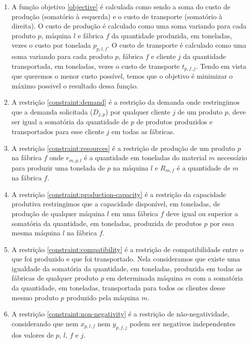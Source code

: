\documentclass{article}
\begin{document}
\begin{enumerate}
    \item A função objetivo \ref{objective} é calculada como sendo a soma do custo de produção (somatório à esquerda) e o custo de transporte (somatório à direita). O custo de produção é calculado como uma soma variando para cada produto $p$, máquina $l$ e fábrica $f$ da quantidade produzida, em toneladas, vezes o custo por tonelada $p_{p,l,f}$. O custo de transporte é calculado como uma soma variando para cada produto $p$, fábrica $f$ e cliente $j$ da quantidade transportada, em toneladas, vezes o custo de transporte $t_{p,f,j}$. Tendo em vista que queremos o menor custo possível, temos que o objetivo é minimizar o máximo possivel o resultado dessa função.

    \item A restrição \ref{constraint:demand} é a restrição da demanda onde restringimos que a demanda solicitada ($D_{j,p}$) por qualquer cliente $j$ de um produto $p$, deve ser igual a somatória da quantidade de $p$ de produtos produzidos e transportados para esse cliente $j$ em todas as fábricas.

    \item A restrição \ref{constraint:resources} é a restrição de produção de um produto $p$ na fábrica $f$ onde $r_{m, p, l}$ é a quantidade em toneladas do material $m$ necessário para produzir uma tonelada de $p$ na máquina $l$ e $R_{m, f}$ é a quantidade de $m$ na fábrica $f$.

    \item A restrição \ref{constraint:production-capacity} é a restrição da capacidade produtiva restringimos que a capacidade disponível, em toneladas, de produção de qualquer máquina $l$ em uma fábrica $f$ deve igual ou superior a somatória da quantidade, em toneladas, produzida de produtos $p$ por essa mesma máquina $l$ na fábrica $f$.

    \item A restrição \ref{constraint:compatibility} é a restrição de compatibilidade entre o que foi produzido e que foi transportado. Nela consideramos que existe uma igualdade da somatória da quantidade, em toneladas, produzida em todas as fábricas de qualquer produto $p$ em determinada máquina $m$ com a somatória da quantidade, em toneladas, transportada para todos os clientes desse mesmo produto $p$ produzido pela máquina $m$.

    \item A restrição \ref{constraint:non-negativity} é a restrição de não-negatividade, considerando que nem $x_{p,l,f}$ nem $y_{p,f,j}$ podem ser negativos independentes dos valores de $p$, $l$, $f$ e $j$.
\end{enumerate}
\end{document}
